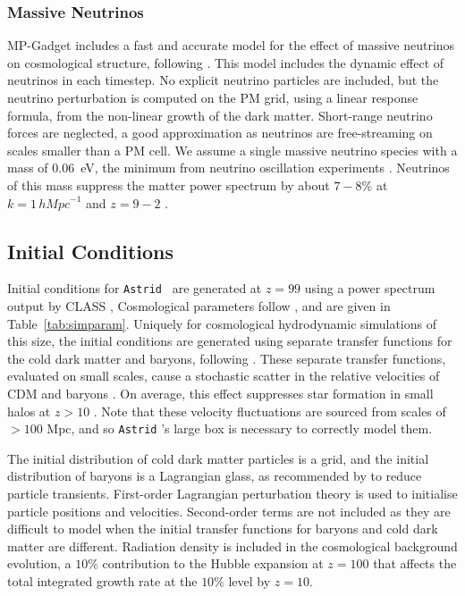 \documentclass[fleqn,usenatbib]{mnras}
\newcommand{\hMpc}{\,h\unit{Mpc}^{-1}}
\def\astrid{\texttt{Astrid} }
\begin{document}
\subsubsection{Massive Neutrinos}
\label{sec:neutrinos}

MP-Gadget includes a fast and accurate model for the effect of massive neutrinos on cosmological structure, following \cite{Yacine:2013}. This model includes the dynamic effect of neutrinos in each timestep.
No explicit neutrino particles are included, but the neutrino perturbation is computed on the PM grid, using a linear response formula, from the non-linear growth of the dark matter. Short-range neutrino forces are neglected, a good approximation as neutrinos are free-streaming on scales smaller than a PM cell.
We assume a single massive neutrino species with a mass of $0.06$~eV, the minimum from neutrino oscillation experiments \citep{deSalas:2018}. Neutrinos of this mass suppress the matter power spectrum by about $7-8\%$ at $k = 1 \hMpc$ and $z=9 - 2$ \citep{Bird:2018}.

\subsection{Initial Conditions}
\label{sec:ics}

Initial conditions for \astrid~are generated at $z=99$ using a power spectrum output by CLASS \citep{CLASS}, Cosmological parameters follow \cite{Planck}, and are given in Table~\ref{tab:simparam}. Uniquely for cosmological hydrodynamic simulations of this size, the initial conditions are generated using separate transfer functions for the cold dark matter and baryons, following \cite{Bird:2020}. These separate transfer functions, evaluated on small scales, cause a stochastic scatter in the relative velocities of CDM and baryons \citep{2010PhRvD..82h3520T}. On average, this effect suppresses star formation in small halos at $z> 10$ \citep[e.g~][]{Naoz:2007}. Note that these velocity fluctuations are sourced from scales of $> 100$ Mpc, and so \astrid's large box is necessary to correctly model them.

The initial distribution of cold dark matter particles is a grid, and the initial distribution of baryons is a Lagrangian glass, as recommended by \cite{Bird:2020} to reduce particle transients. First-order Lagrangian perturbation theory \citep{Zeldovich:1970, Crocce:2006} is used to initialise particle positions and velocities. Second-order terms are not included as they are difficult to model when the initial transfer functions for baryons and cold dark matter are different. Radiation density is included in the cosmological background evolution, a $10\%$ contribution to the Hubble expansion at $z=100$ that affects the total integrated growth rate at the $10\%$ level by $z=10$.
\end{document}

